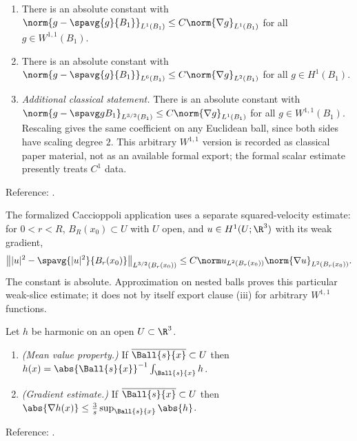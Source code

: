 \documentclass[11pt,reqno]{amsart}
\begin{document}
\begin{externalinput}\label{ext:poincare}\leavevmode
\begin{enumerate}
\item[(i)] There is an absolute constant with
  $\norm{g-\spavg{g}{B_{1}}}_{L^{1}(B_{1})}\le C\norm{\nabla g}_{L^{1}(B_{1})}$
  for all $g\in W^{1,1}(B_{1})$.
\item[(ii)] There is an absolute constant with
  $\norm{g-\spavg{g}{B_{1}}}_{L^{6}(B_{1})}\le C\norm{\nabla g}_{L^{2}(B_{1})}$
  for all $g\in H^{1}(B_{1})$.
\item[(iii)] \emph{Additional classical statement.} There is an absolute constant with
  $\norm{g-\spavg g{B_1}}_{L^{3/2}(B_1)}
          \le C\norm{\nabla g}_{L^1(B_1)}$
  for all $g\in W^{1,1}(B_1)$. Rescaling gives the same coefficient on
  any Euclidean ball, since both sides have scaling degree $2$.
  This arbitrary $W^{1,1}$ version is recorded as classical paper material,
  not as an available formal export; the formal scalar estimate presently
  treats $C^1$ data.
\end{enumerate}
Reference: \cite[Ch.~7]{GilbargTrudinger2001}.
\end{externalinput}

The formalized Caccioppoli application uses a separate squared-velocity
estimate: for $0<r<R$, $B_R(x_0)\subset U$ with $U$ open, and
$u\in H^1(U;\R^3)$ with its weak gradient,
\[
 \bigl\||u|^2-\spavg{|u|^2}{B_r(x_0)}\bigr\|_{L^{3/2}(B_r(x_0))}
 \le C\norm u_{L^2(B_r(x_0))}\norm{\nabla u}_{L^2(B_r(x_0))}.
\]
The constant is absolute. Approximation on nested balls proves this
particular weak-slice estimate; it does not by itself export clause (iii)
for arbitrary $W^{1,1}$ functions.

\begin{externalinput}\label{ext:harmonic}
Let $h$ be harmonic on an open $U\subset\R^{3}$.
\begin{enumerate}
\item[(i)] \emph{(Mean value property.)} If $\overline{\Ball{s}{x}}\subset U$
  then $h(x)=\abs{\Ball{s}{x}}^{-1}\int_{\Ball{s}{x}}h$.
\item[(ii)] \emph{(Gradient estimate.)} If $\overline{\Ball{s}{x}}\subset U$
  then $\abs{\nabla h(x)}\le\tfrac3s\sup_{\Ball{s}{x}}\abs{h}$.
\end{enumerate}
Reference: \cite[Ch.~2]{GilbargTrudinger2001}.
\end{externalinput}
\end{document}
